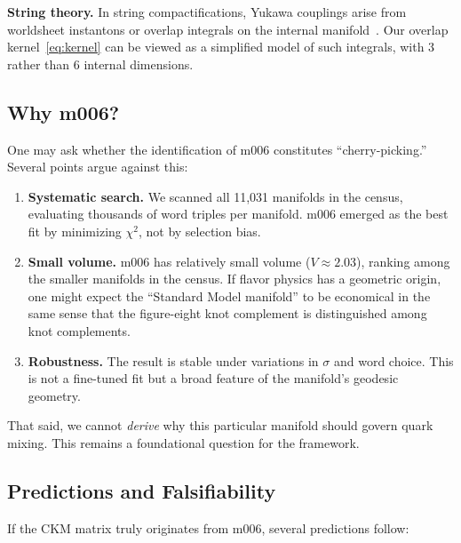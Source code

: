 \documentclass[epjc3]{svjour3}
\begin{document}
\textbf{String theory.} In string compactifications, Yukawa couplings 
arise from worldsheet instantons or overlap integrals on the internal 
manifold~\cite{Ibanez2012}. Our overlap kernel~\eqref{eq:kernel} can 
be viewed as a simplified model of such integrals, with 3 rather than 
6 internal dimensions.

\subsection{Why m006?}
\label{subsec:why_m006}

One may ask whether the identification of m006 constitutes 
``cherry-picking.'' Several points argue against this:

\begin{enumerate}
\item \textbf{Systematic search.} We scanned all 11,031 manifolds in 
the census, evaluating thousands of word triples per manifold. m006 
emerged as the best fit by minimizing $\chi^2$, not by selection bias.

\item \textbf{Small volume.} m006 has relatively small volume 
($V \approx 2.03$), ranking among the smaller manifolds in the census. 
If flavor physics has a geometric origin, one might expect the 
``Standard Model manifold'' to be economical in the same sense that 
the figure-eight knot complement is distinguished among knot complements.

\item \textbf{Robustness.} The result is stable under variations in 
$\sigma$ and word choice. This is not a fine-tuned fit but a broad 
feature of the manifold's geodesic geometry.
\end{enumerate}

That said, we cannot \emph{derive} why this particular manifold should 
govern quark mixing. This remains a foundational question for the 
framework.

\subsection{Predictions and Falsifiability}
\label{subsec:predictions}

If the CKM matrix truly originates from m006, several predictions follow:
\end{document}
